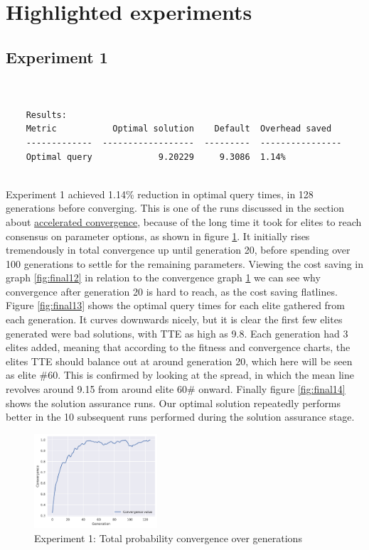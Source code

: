\documentclass[a4paper,english]{report}
\begin{document}
	\section{Highlighted experiments}
	\label{sec:highlighted}
	\subsection{Experiment 1}
	\begin{verbatim}
	
	
	Results:
	Metric           Optimal solution    Default  Overhead saved
	-------------  ------------------  ---------  ----------------
	Optimal query             9.20229     9.3086  1.14%
		
	\end{verbatim}
	Experiment 1 achieved 1.14\% reduction in optimal query times, in 128 generations before converging. This is one of the runs discussed in the section about \hyperref[sec:agnosstable]{accelerated convergence}, because of the long time it took for elites to reach consensus on parameter options, as shown in figure \ref{fig:final11}. It initially rises tremendously in total convergence up until generation 20, before spending over 100 generations to settle for the remaining parameters. Viewing the cost saving in graph \ref{fig:final12} in relation to the convergence graph \ref{fig:final11} we can see why convergence after generation 20 is hard to reach, as the cost saving flatlines. Figure \ref{fig:final13} shows the optimal query times for each elite gathered from each generation. It curves downwards nicely, but it is clear the first few elites generated were bad solutions, with TTE as high as 9.8. Each generation had 3 elites added, meaning that according to the fitness and convergence charts, the elites TTE should balance out at around generation 20, which here will be seen as elite \#60. This is confirmed by looking at the spread, in which the mean line revolves around 9.15 from around elite 60\# onward. Finally figure \ref{fig:final14} shows the solution assurance runs. Our optimal solution repeatedly performs better in the 10 subsequent runs performed during the solution assurance stage.
	\clearpage
	\begin{figure}[H]
		\centering
		\includegraphics[width=130pt]{runlogs/final1/1}
		\caption{Experiment 1: Total probability convergence over generations}
		\label{fig:final11}
	\end{figure}
\end{document}
